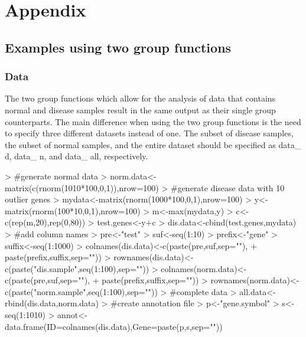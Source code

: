 \documentclass[11pt, a4paper]{article}
\begin{document}
\section{Appendix}
\subsection{Examples using two group functions}
\subsubsection{Data}
The two group functions which allow for the analysis of data that contains normal and disease samples result in the same output as their single group counterparts. The main difference when using the two group functions is the need to specify three different datasets instead of one. The subset of disease samples, the subset of normal samples, and the entire dataset should be specified as data\_ d, data\_ n, and data\_ all, respectively.

\begin{Schunk}
\begin{Sinput}
> #generate normal data
>  norm.data<-matrix(c(rnorm(1010*100,0,1)),nrow=100)
> #generate disease data with 10 outlier genes
>   mydata<-matrix(rnorm(1000*100,0,1),nrow=100)
>   y<-matrix(rnorm(100*10,0,1),nrow=100)
>   m<-max(mydata,y)
>   c<-c(rep(m,20),rep(0,80))
>   test.genes<-y+c
>   dis.data<-cbind(test.genes,mydata)
> #add column names
>   pre<-"test"
>   suf<-seq(1:10)
>   prefix<-"gene"
>   suffix<-seq(1:1000)
>   colnames(dis.data)<-c(paste(pre,suf,sep=""),
+                         paste(prefix,suffix,sep=""))
>   rownames(dis.data)<-c(paste("dis.sample",seq(1:100),sep=""))
>   colnames(norm.data)<-c(paste(pre,suf,sep=""),
+                          paste(prefix,suffix,sep=""))
>   rownames(norm.data)<-c(paste("norm.sample",seq(1:100),sep=""))
> #complete data
>   all.data<-rbind(dis.data,norm.data)
> #create annotation file
>   p<-"gene.symbol"
>   s<-seq(1:1010)
>   annot<-data.frame(ID=colnames(dis.data),Gene=paste(p,s,sep=""))
\end{Sinput}
\end{Schunk}
\end{document}
